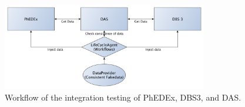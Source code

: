 \begin{figure}[h]
 \centering
   \includegraphics[width=0.8\textwidth]{IntegrationTests.pdf}
       \caption{Workflow of the integration testing of PhEDEx, DBS3, and DAS.}
 \label{fig:Integ-Phedex-DBS-DAS}
\end{figure}




